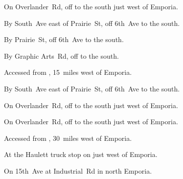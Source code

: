 

\begin{LocationList}

On Overlander~Rd, off  to the south just west of Emporia.

By South~Ave east of Prairie~St, off  6th~Ave to the south.

By Prairie~St, off  6th~Ave to the south.

By Graphic Arts~Rd, off  to the south.

Accessed from , 15~miles west of Emporia.

By South~Ave east of Prairie~St, off  6th~Ave to the south.

On Overlander~Rd, off  to the south just west of Emporia.

On Overlander~Rd, off  to the south just west of Emporia.

Accessed from , 30~miles west of Emporia.

At the Haulett truck stop on  just west of Emporia.

On 15th~Ave at Industrial~Rd in north Emporia.

\end{LocationList}

